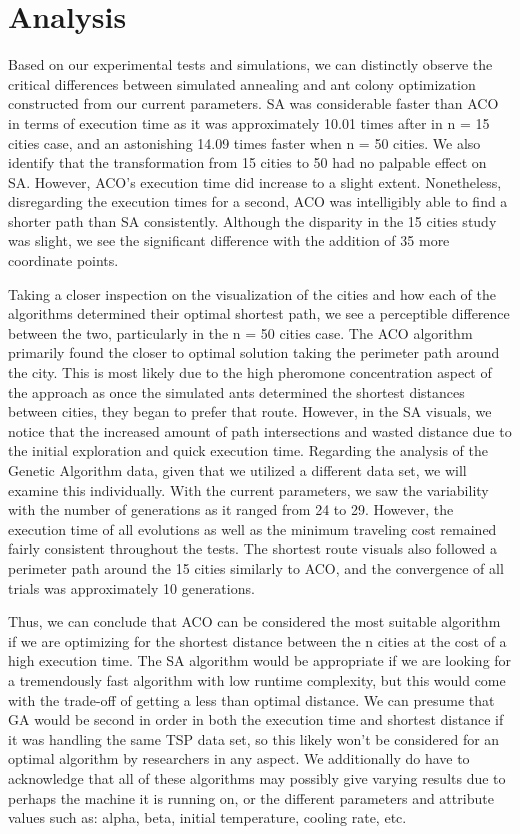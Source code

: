 \documentclass{article}
\begin{document}
\section{Analysis}
Based on our experimental tests and simulations, we can distinctly observe the critical differences between simulated annealing and ant colony optimization constructed from our current parameters. SA was considerable faster than ACO in terms of execution time as it was approximately 10.01 times after in n = 15 cities case, and an astonishing 14.09 times faster when n = 50 cities. We also identify that the transformation from 15 cities to 50 had no palpable effect on SA. However, ACO's execution time did increase to a slight extent. Nonetheless, disregarding the execution times for a second, ACO was intelligibly able to find a shorter path than SA consistently. Although the disparity in the 15 cities study was slight, we see the significant difference with the addition of 35 more coordinate points. 
\par Taking a closer inspection on the visualization of the cities and how each of the algorithms determined their optimal shortest path, we see a perceptible difference between the two, particularly in the n = 50 cities case. The ACO algorithm primarily found the closer to optimal solution taking the perimeter path around the city. This is most likely due to the high pheromone concentration aspect of the approach as once the simulated ants determined the shortest distances between cities, they began to prefer that route. However, in the SA visuals, we notice that the increased amount of path intersections and wasted distance due to the initial exploration and quick execution time. Regarding the analysis of the Genetic Algorithm data, given that we utilized a different data set, we will examine this individually. With the current parameters, we saw the variability with the number of generations as it ranged from 24 to 29. However, the execution time of all evolutions as well as the minimum traveling cost remained fairly consistent throughout the tests. The shortest route visuals also followed a perimeter path around the 15 cities similarly to ACO, and the convergence of all trials was approximately 10 generations. 
\par Thus, we can conclude that ACO can be considered the most suitable algorithm if we are optimizing for the shortest distance between the n cities at the cost of a high execution time. The SA algorithm would be appropriate if we are looking for a tremendously fast algorithm with low runtime complexity, but this would come with the trade-off of getting a less than optimal distance. We can presume that GA would be second in order in both the execution time and shortest distance if it was handling the same TSP data set, so this likely won't be considered for an optimal algorithm by researchers in any aspect. We additionally do have to acknowledge that all of these algorithms may possibly give varying results due to perhaps the machine it is running on, or the different parameters and attribute values such as: alpha, beta, initial temperature, cooling rate, etc.
\end{document}
